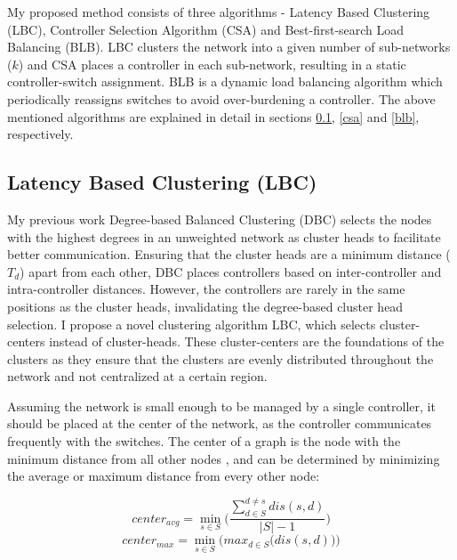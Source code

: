 \documentclass[journal]{IEEEtran}
\begin{document}
My proposed method consists of three algorithms - Latency Based Clustering (LBC), Controller Selection Algorithm (CSA) and Best-first-search Load Balancing (BLB). LBC clusters the network into a given number of sub-networks ($k$) and CSA places a controller in each sub-network, resulting in a static controller-switch assignment. BLB is a dynamic load balancing algorithm which periodically reassigns switches to avoid over-burdening a controller. The above mentioned algorithms are explained in detail in sections \ref{lbc}, \ref{csa} and \ref{blb}, respectively.

\subsection{Latency Based Clustering (LBC)} \label{lbc}

My previous work Degree-based Balanced Clustering (DBC) \cite{aziz2019degree} selects the nodes with the highest degrees in an unweighted network as cluster heads to facilitate better communication. Ensuring that the cluster heads are a minimum distance ($T_d$) apart from each other, DBC places controllers based on inter-controller and intra-controller distances. However, the controllers are rarely in the same positions as the cluster heads, invalidating the degree-based cluster head selection. I propose a novel clustering algorithm LBC, which selects cluster-centers instead of cluster-heads. These cluster-centers are the foundations of the clusters as they ensure that the clusters are evenly distributed throughout the network and not centralized at a certain region.

Assuming the network is small enough to be managed by a single controller, it should be placed at the center of the network, as the controller communicates frequently with the switches. The center of a graph is the node with the minimum distance from all other nodes \cite{wilson1979introduction}, and can be determined by minimizing the average or maximum distance from every other node:

\begin{equation} \label{eqn:avgDis}
center_{avg} = \min_{s\in S}\bigg(\frac{\sum_{d\in S}^{d\ne s}dis(s,d)}{|S|-1}\bigg)
\end{equation}
\begin{equation} \label{eqn:maxDis}
center_{max} = \min_{s\in S}\bigg(max_{d\in S}\big(dis(s,d)\big)\bigg)
\end{equation}
\end{document}
